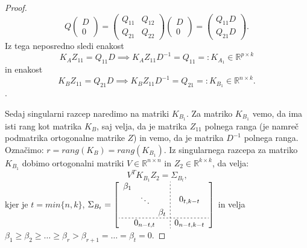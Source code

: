 \documentclass[mat1]{article}
\begin{document}
\begin{proof}
$$Q
\begin{pmatrix}
D \\ 
0
\end{pmatrix} = 
\begin{pmatrix}
Q_{11} & Q_{12} \\ 
Q_{21} & Q_{22}
\end{pmatrix}
\begin{pmatrix}
D \\ 
0
\end{pmatrix} =
\begin{pmatrix}
Q_{11} D \\ 
Q_{21} D
\end{pmatrix} \text{.}
$$
Iz tega neposredno sledi enakost
$$
K_A Z_{11} = Q_{11} D \implies K_A Z_{11} D^{-1} = Q_{11} =: K_{A_1}  \in \mathbb{R}^{p \times k} %
$$
in enakost
$$
K_B Z_{11} = Q_{21} D \implies K_B Z_{11} D^{-1} = Q_{21} =: K_{B_1} \in \mathbb{R}^{ n \times k} \text{.}
$$.

Sedaj singularni razcep naredimo na matriki $K_{B_1}$. Za matriko $K_{B_1}$ vemo, da ima isti rang kot matrika $K_B$, saj velja, da je matrika $Z_{11}$ polnega ranga (je namreč podmatrika ortogonalne matrike $Z$) in vemo, da je matrika $D^{-1}$ polnega ranga. Označimo: $r = rang(K_B) = rang(K_{B_1})$. Iz singularnega razcepa za matriko $K_{B_1}$ dobimo ortogonalni matriki $V \in \mathbb{R}^{ n \times n}$ in $Z_2 \in \mathbb{R}^{ k \times k}$, da velja:
\begin{equation}
V^T K_{B_1} Z_2 = \Sigma_{B_t}
 \text{,}  \label{eq:3}
\end{equation}
kjer je $t = min\{n, k\}$, 
$\Sigma_{B_t} = 
\left[
\begin{array}{c;{2pt/2pt}c}
\begin{matrix}
\beta_1 & & \\
 & \ddots & \\
 & & \beta_t
\end{matrix} & 0_{t, k - t}
 \\ \hdashline[2pt/2pt]
0_{n-t, t} & 0_{n-t, k-t}
\end{array} \right]$
in velja 
$ \beta_1 \geq \beta_2 \geq \ldots \geq \beta_r > \beta_{r+1} = \ldots = \beta_t = 0 $.


\end{proof}
\end{document}
